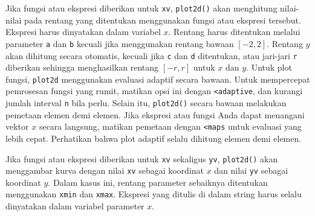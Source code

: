 \documentclass[11pt, a4paper]{article}
\begin{document}
Jika fungsi atau ekspresi diberikan untuk \texttt{xv}, \texttt{plot2d()} akan menghitung nilai-nilai pada rentang yang ditentukan menggunakan fungsi atau ekspresi tersebut. Ekspresi harus dinyatakan dalam variabel $x$. Rentang harus ditentukan melalui parameter \texttt{a} dan \texttt{b} kecuali jika menggunakan rentang bawaan $[-2,2]$. Rentang $y$ akan dihitung secara otomatis, kecuali jika \texttt{c} dan \texttt{d} ditentukan, atau jari-jari \texttt{r} diberikan sehingga menghasilkan rentang $[-r,r]$ untuk $x$ dan $y$. Untuk plot fungsi, \texttt{plot2d} menggunakan evaluasi adaptif secara bawaan. Untuk mempercepat pemrosesan fungsi yang rumit, matikan opsi ini dengan \texttt{<adaptive}, dan kurangi jumlah interval \texttt{n} bila perlu. Selain itu, \texttt{plot2d()} secara bawaan melakukan pemetaan elemen demi elemen. Jika ekspresi atau fungsi Anda dapat menangani vektor $x$ secara langsung, matikan pemetaan dengan \texttt{<maps} untuk evaluasi yang lebih cepat. Perhatikan bahwa plot adaptif selalu dihitung elemen demi elemen.

Jika fungsi atau ekspresi diberikan untuk \texttt{xv} sekaligus \texttt{yv}, \texttt{plot2d()} akan menggambar kurva dengan nilai \texttt{xv} sebagai koordinat $x$ dan nilai \texttt{yv} sebagai koordinat $y$. Dalam kasus ini, rentang parameter sebaiknya ditentukan menggunakan \texttt{xmin} dan \texttt{xmax}. Ekspresi yang ditulis di dalam string harus selalu dinyatakan dalam variabel parameter $x$.
\end{document}
